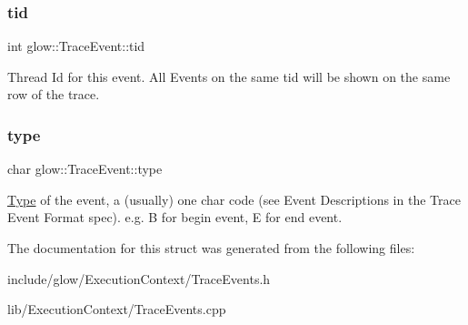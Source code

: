 \subsubsection{\texorpdfstring{tid}{tid}}
{\footnotesize\ttfamily int glow\+::\+Trace\+Event\+::tid}

Thread Id for this event. All Events on the same tid will be shown on the same row of the trace. \mbox{\label{structglow_1_1_trace_event_a959851b24699050f16b536c8a2807dbd}} 
\subsubsection{\texorpdfstring{type}{type}}
{\footnotesize\ttfamily char glow\+::\+Trace\+Event\+::type}

\hyperlink{structglow_1_1_type}{Type} of the event, a (usually) one char code (see Event Descriptions in the Trace Event Format spec). e.\+g. \textquotesingle{}B\textquotesingle{} for begin event, \textquotesingle{}E\textquotesingle{} for end event. 

The documentation for this struct was generated from the following files\+:\begin{DoxyCompactItemize}
\item 
include/glow/\+Execution\+Context/Trace\+Events.\+h\item 
lib/\+Execution\+Context/Trace\+Events.\+cpp\end{DoxyCompactItemize}
